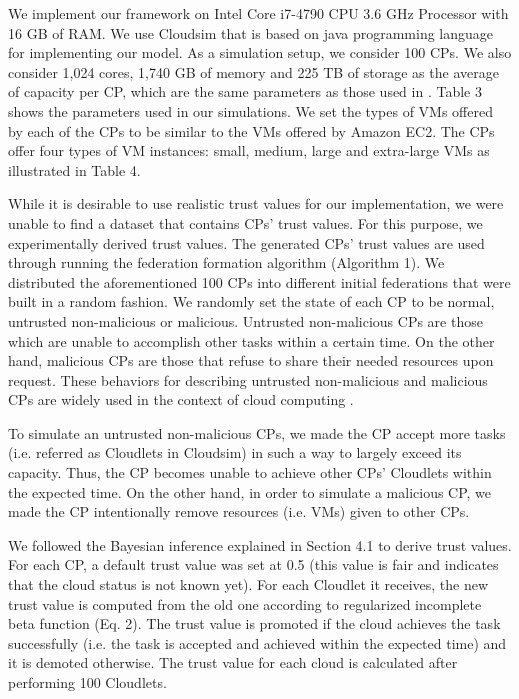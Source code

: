 \documentclass[preprint]{elsarticle}
\theoremstyle{definition}
\theoremstyle{remark}
\theoremstyle{property}
\begin{document}
We implement our framework on Intel Core
i7-4790 CPU 3.6 GHz Processor with 16 GB of RAM.
We use Cloudsim \cite{calheiros2011cloudsim} that is based on java programming language for implementing our model. As a
simulation setup, we consider 100 CPs. We
also consider 1,024 cores, 1,740 GB of memory and
225 TB of storage as the average of capacity per
CP, which are the same parameters as those used in
\cite{mashayekhy2015cloud}. Table 3 shows the parameters used in our simulations.
We set the types of VMs offered by each of the CPs
to be similar to the VMs offered by Amazon EC2.
The CPs offer four types of VM instances:
small, medium, large and extra-large VMs as illustrated
in Table 4.

While it is desirable to use realistic trust values for our implementation, we were unable to find
a dataset that contains CPs' trust values. For
this purpose, we experimentally derived trust values. The generated CPs' trust values are used through running the federation formation algorithm (Algorithm 1). We distributed the aforementioned 100 CPs into different initial federations that were built in a random fashion. We randomly set the state of each CP to be normal, untrusted non-malicious or malicious. Untrusted non-malicious CPs are those which are unable to accomplish other tasks within a certain time. On the other hand, malicious CPs are those that refuse to share their needed resources upon request. These behaviors for describing untrusted non-malicious and malicious CPs are widely used in the context of cloud computing \cite{habib2010cloud} \cite{fan2014novel} \cite{alhamad2010sla}.

To simulate an untrusted non-malicious CPs, we made the CP accept more tasks (i.e. referred as Cloudlets in Cloudsim) in such a way to
largely exceed its capacity. Thus, the CP becomes unable to achieve other CPs' Cloudlets within the expected time. On the other hand, in order to simulate a malicious CP, we made the CP intentionally remove resources (i.e. VMs) given to other CPs.

We followed the Bayesian inference explained in Section 4.1 to derive trust values. For each CP, a default trust value was set at 0.5 (this value is fair and indicates that the cloud status is not known yet). For each Cloudlet it receives, the new trust value is computed from the old one according to regularized incomplete beta function (Eq. 2). The trust value is promoted if the cloud achieves the task successfully (i.e. the task is accepted and achieved within the expected time) and it is demoted otherwise. The trust value for each cloud is calculated after performing 100 Cloudlets.
\end{document}
